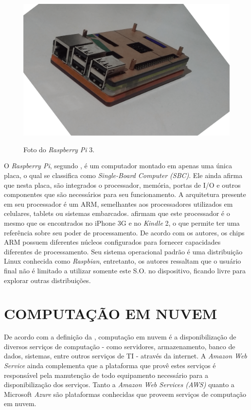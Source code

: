 \begin{figure}[!ht]
\centering
\caption{Foto do \textit{Raspberry Pi} 3.} 
{\includegraphics[scale=.20]{imagens/raspberry-min.png}}\\
 \label{Fig:raspberry_pi}
\end{figure}

O \textit{Raspberry Pi}, segundo , é um computador montado em apenas uma única placa, o qual se classifica como \textit{Single-Board Computer (SBC)}. Ele ainda afirma que nesta placa, são integrados o processador, memória, portas de I/O e outros componentes que são necessários para seu funcionamento. A arquitetura presente em seu processador é um ARM, semelhantes aos processadores utilizados em celulares, tablets ou sistemas embarcados.  afirmam que este processador é o mesmo que os encontrados no iPhone 3G e no \textit{Kindle} 2, o que permite ter uma referência sobre seu poder de processamento. De acordo com os autores, os chips ARM possuem diferentes núcleos configurados para fornecer capacidades diferentes de processamento. Seu sistema operacional padrão é uma distribuição Linux conhecida como \textit{Raspbian}, entretanto, os autores ressaltam que o usuário final não é limitado a utilizar somente este S.O. no dispositivo, ficando livre para explorar outras distribuições.

\section{COMPUTAÇÃO EM NUVEM}
De acordo com a definição da , computação em nuvem é a disponibilização de diversos serviços de computação - como servidores, armazenamento, banco de dados, sistemas, entre outros serviços de TI - através da internet. A \textit{Amazon Web Service} \nocite{amazoncloudcomputing} ainda complementa que a plataforma que provê estes serviços é responsável pela manutenção de todo equipamento necessário para a disponibilização dos serviços. Tanto a \textit{Amazon Web Services (AWS)} quanto a Microsoft \textit{Azure} são plataformas conhecidas que proveem serviços de computação em nuvem.

